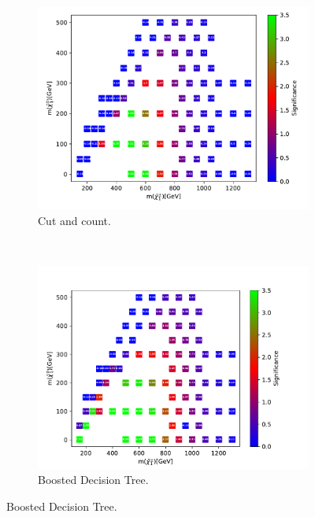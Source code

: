 \begin{figure}[H]
    \centering
    \begin{subfigure}[t!]{0.49\textwidth}
    \includegraphics[width = \textwidth]{Figures/Significances/significanceCutandCount_slepsnu_all.pdf}
    \caption{Cut and count.}
        \label{fig:signHighslepsnucandc}
    \end{subfigure}
    \\
    \begin{subfigure}[t!]{0.49\textwidth}
    \includegraphics[width = \textwidth]{Figures/Significances/significance_BDT_slepsnu_High_level.pdf}
    \caption{Boosted Decision Tree.}
        \label{fig:signHighslepsnuBDT}
    \end{subfigure}      

\end{figure}
